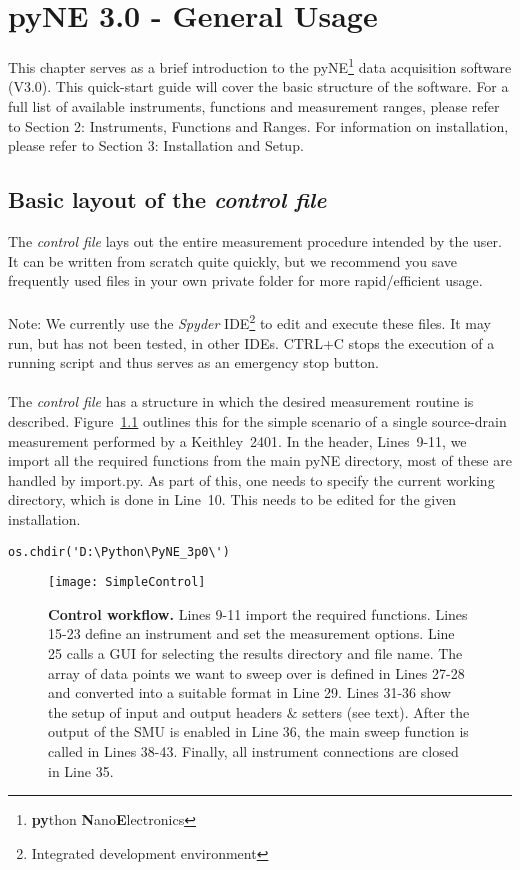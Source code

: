 \chapter{pyNE 3.0 - General Usage}
\label{Chap:GeneralUsage}

\lettrine[lines=2]{\color{myBrown}\textsf{T}}{}his chapter serves as a brief introduction to the pyNE\footnote{\textbf{py}thon \textbf{N}ano\textbf{E}lectronics} data acquisition software (V3.0). This quick-start guide will cover the basic structure of the software. For a full list of available instruments, functions and measurement ranges, please refer to Section 2: Instruments, Functions and Ranges. For information on installation, please refer to Section 3: Installation and Setup.\\

\section{Basic layout of the \textit{control file}}
The \textit{control file} lays out the entire measurement procedure intended by the user. It can be written from scratch quite quickly, but we recommend you save frequently used files in your own private folder for more rapid/efficient usage.\\
\\
Note: We currently use the \textit{Spyder} IDE\footnote{Integrated development environment} to edit and execute these files. It may run, but has not been tested, in other IDEs. CTRL+C stops the execution of a running script and thus serves as an emergency stop button.\\
\\
The \textit{control file} has a structure in which the desired measurement routine is described. Figure~\ref{Fig:SimpleControl} outlines this for the simple scenario of a single source-drain measurement performed by a Keithley~2401. In the header, Lines~9-11, we import all the required functions from the main pyNE directory, most of these are handled by import.py. As part of this, one needs to specify the current working directory, which is done in Line~10. This needs to be edited for the given installation.\\

\begin{verbatim}
os.chdir('D:\Python\PyNE_3p0\')
\end{verbatim}

\begin{figure}[h]
\texttt{[image: SimpleControl]}
\caption{\textbf{Control workflow.} Lines 9-11 import the required functions. Lines 15-23 define an instrument and set the measurement options. Line 25 calls a GUI for selecting the results directory and file name. The array of data points we want to sweep over is defined in Lines 27-28 and converted into a suitable format in Line 29. Lines 31-36 show the setup of input and output headers $\textsf{\&}$ setters (see text). After the output of the SMU is enabled in Line 36, the main sweep function is called in Lines 38-43. Finally, all instrument connections are closed in Line 35.}
\label{Fig:SimpleControl}
\end{figure}

